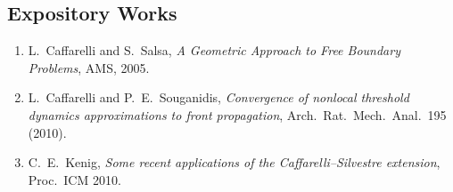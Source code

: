 \subsection*{Expository Works}
\begin{enumerate}
    \item L.\ Caffarelli and S.\ Salsa, \textit{A Geometric Approach to Free Boundary Problems}, AMS, 2005.
    \item L.\ Caffarelli and P.\ E.\ Souganidis, \textit{Convergence of nonlocal threshold dynamics approximations to front propagation}, Arch.\ Rat.\ Mech.\ Anal.\ 195 (2010).
    \item C.\ E.\ Kenig, \textit{Some recent applications of the Caffarelli--Silvestre extension}, Proc.\ ICM 2010.
\end{enumerate}

